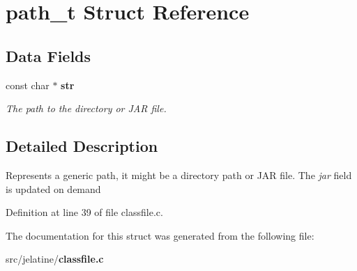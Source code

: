 \section{path\_\-t Struct Reference}
\label{structpath__t}
\subsection*{Data Fields}
\begin{DoxyCompactItemize}
\item 
const char $\ast$ {\bf str}\label{structpath__t_ae8bfa4e6978a4fd2ebc6a913a7a23c7a}

\begin{DoxyCompactList}\small\item\em The path to the directory or JAR file. \item\end{DoxyCompactList}\end{DoxyCompactItemize}


\subsection{Detailed Description}
Represents a generic path, it might be a directory path or JAR file. The {\itshape jar\/} field is updated on demand 

Definition at line 39 of file classfile.c.



The documentation for this struct was generated from the following file:\begin{DoxyCompactItemize}
\item 
src/jelatine/{\bf classfile.c}\end{DoxyCompactItemize}
